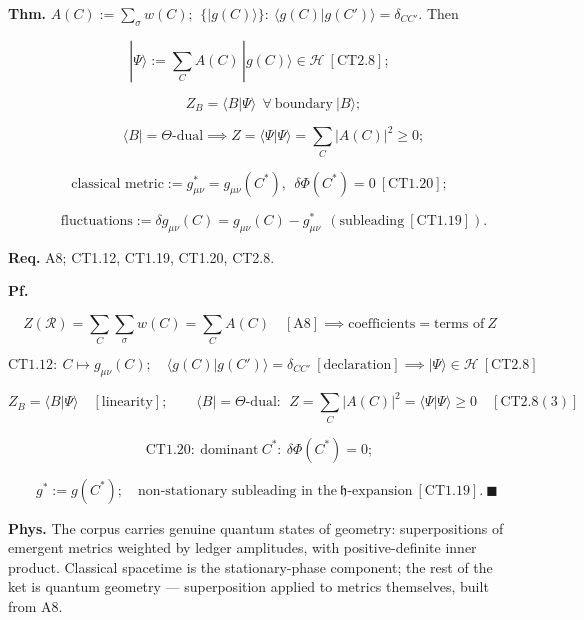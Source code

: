 \begin{theorem}\label{tag:CT1-27}
\textbf{Thm.} $A(C):=\sum_\sigma w(C)$; $\ \{|g(C)\rangle\}:\ \langle g(C)|g(C')\rangle=\delta_{CC'}$. Then

\[
|\Psi\rangle:=\sum_CA(C)\,|g(C)\rangle\in\mathcal H\ [\mathrm{CT2.8}];
\]

\[
\qquad Z_B=\langle B|\Psi\rangle\ \ \forall\ \text{boundary}\ |B\rangle;
\]

\[
\qquad \langle B|=\Theta\text{-dual}\implies Z=\langle\Psi|\Psi\rangle=\sum_C|A(C)|^2\ge0;
\]

\[
\text{classical metric}:=g^\ast_{\mu\nu}=g_{\mu\nu}(C^\ast),\ \ \delta\Phi(C^\ast)=0\ [\mathrm{CT1.20}];
\]

\[
\qquad \text{fluctuations}:=\delta g_{\mu\nu}(C)=g_{\mu\nu}(C)-g^\ast_{\mu\nu}\ \ (\text{subleading}\ [\mathrm{CT1.19}]).
\]

\textbf{Req.} A8; CT1.12, CT1.19, CT1.20, CT2.8.

\textbf{Pf.}

\[
Z(\mathcal R)=\sum_C\sum_\sigma w(C)=\sum_CA(C)\quad[\mathrm{A8}]\implies\text{coefficients}=\text{terms of}\ Z
\]

\[
\mathrm{CT1.12}:\ C\mapsto g_{\mu\nu}(C);\quad\langle g(C)|g(C')\rangle=\delta_{CC'}\ [\text{declaration}]\implies|\Psi\rangle\in\mathcal H\ [\mathrm{CT2.8}]
\]

\[
Z_B=\langle B|\Psi\rangle\quad[\text{linearity}];\qquad
\langle B|=\Theta\text{-dual}:\ \ Z=\sum_C|A(C)|^2=\langle\Psi|\Psi\rangle\ge0\quad[\mathrm{CT2.8}(3)]
\]

\[
\mathrm{CT1.20}:\ \text{dominant}\ C^\ast:\ \delta\Phi(C^\ast)=0;
\]

\[
\quad g^\ast:=g(C^\ast);\quad\text{non-stationary subleading in the}\ \mathfrak h\text{-expansion}\ [\mathrm{CT1.19}].\ \blacksquare
\]

\textbf{Phys.} The corpus carries genuine quantum states of geometry: superpositions of emergent metrics weighted by ledger amplitudes, with positive-definite inner product. Classical spacetime is the stationary-phase component; the rest of the ket is quantum geometry — superposition applied to metrics themselves, built from A8.

\end{theorem}

